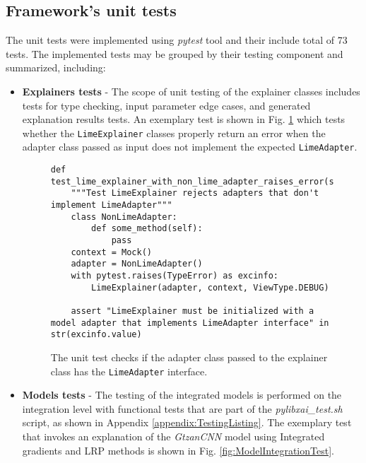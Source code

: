 \documentclass[
    bindingoffset=5mm,  %
    footnoteindent=3mm, %
    hyphenation=true    %
]{src/wut-thesis}
\begin{document}
\subsection{Framework's unit tests}

The unit tests were implemented using \emph{pytest} tool and
their include total of 73 tests. The implemented tests may be grouped by their
testing component and summarized, including:

\begin{itemize}
    \item \textbf{Explainers tests} - The scope of unit testing of the explainer classes includes
        tests for type checking, input parameter edge cases, and generated explanation results tests.
        An exemplary test is shown in Fig. \ref{fig:ExplainerUnitTest} which tests whether
        the \texttt{LimeExplainer} classes properly return an error when the adapter class passed as
        input does not implement the expected \texttt{LimeAdapter}.
    
\begin{figure}[h]
\begin{verbatim}
def test_lime_explainer_with_non_lime_adapter_raises_error(self):
    """Test LimeExplainer rejects adapters that don't implement LimeAdapter"""
    class NonLimeAdapter:
        def some_method(self):
            pass
    context = Mock()
    adapter = NonLimeAdapter()
    with pytest.raises(TypeError) as excinfo:
        LimeExplainer(adapter, context, ViewType.DEBUG)
    
    assert "LimeExplainer must be initialized with a model adapter that implements LimeAdapter interface" in str(excinfo.value)
\end{verbatim}
\caption{The unit test checks if the adapter class passed to the explainer class has the \texttt{LimeAdapter} interface.}
\label{fig:ExplainerUnitTest}
\end{figure}

    \item \textbf{Models tests} - The testing of the integrated models is performed on the integration level with
        functional tests that are part of the \emph{pylibxai\_test.sh} script, as shown in Appendix
        \ref{appendix:TestingListing}. The exemplary test that invokes an explanation of the
        \emph{GtzanCNN} model using Integrated gradients and LRP methods is shown in Fig.
        \ref{fig:ModelIntegrationTest}.


\end{itemize}
\end{document}
